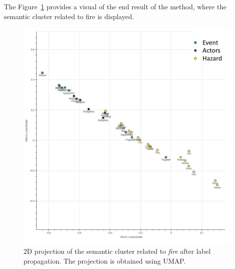 The Figure~\ref{processing:fire-example} provides a visual of the end result of the method,
where the semantic cluster related to fire is displayed.


\begin{figure}[htb]
    \centering
    \includegraphics[width=\textwidth]{figures/chap-4/fire-example.pdf}
    \caption{2D projection of the semantic cluster related to \textit{fire} after label propagation. The projection is obtained using UMAP.}
    \label{processing:fire-example}
\end{figure}

% 


